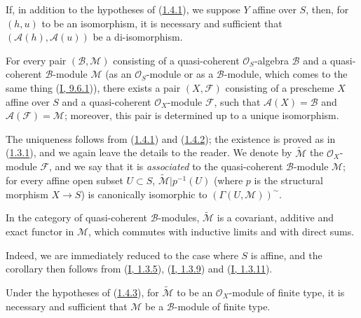 \begin{corollary}[1.4.2]
\label{II.1.4.2}
If, in addition to the hypotheses of (\hyperref[II.1.4.1]{1.4.1}), we
suppose $Y$ affine over $S$, then, for $(h,u)$ to be an isomorphism,
it is necessary and sufficient that $(\mathcal{A}(h),\mathcal{A}(u))$ be a
di-isomorphism.
\end{corollary}

\begin{proposition}[1.4.3]
\label{II.1.4.3}
For every pair $(\mathcal{B},\mathcal{M})$ consisting of a quasi-coherent
$\mathcal{O}_S$-algebra $\mathcal{B}$ and a quasi-coherent
$\mathcal{B}$-module $\mathcal{M}$ (as an
$\mathcal{O}_S$-module or as a $\mathcal{B}$-module, which comes to the
same thing (\hyperref[I.9.6.1]{I, 9.6.1})), there exists a pair
$(X,\mathcal{F})$ consisting of a prescheme $X$ affine over $S$ and a
quasi-coherent $\mathcal{O}_X$-module $\mathcal{F}$, such that
$\mathcal{A}(X)=\mathcal{B}$ and $\mathcal{A}(\mathcal{F})=\mathcal{M}$;
moreover, this pair is determined up to a unique isomorphism.
\end{proposition}

The uniqueness follows from (\hyperref[II.1.4.1]{1.4.1}) and
(\hyperref[II.1.4.2]{1.4.2}); the existence is proved as in
(\hyperref[II.1.3.1]{1.3.1}), and we again leave the details to the
reader. We denote by $\widetilde{\mathcal{M}}$ the $\mathcal{O}_X$-module
$\mathcal{F}$, and we say that it is \emph{associated} to the quasi-coherent
$\mathcal{B}$-module $\mathcal{M}$; for every affine open subset
$U\subset S$, $\widetilde{\mathcal{M}}|p^{-1}(U)$ (where $p$ is the
structural morphism $X\to S$) is canonically isomorphic to
$(\Gamma(U,\mathcal{M}))^{\sim}$.

\begin{corollary}[1.4.4]
\label{II.1.4.4}
In the category of quasi-coherent $\mathcal{B}$-modules,
$\widetilde{\mathcal{M}}$ is a covariant, additive and exact functor in
$\mathcal{M}$, which commutes with inductive limits and with direct sums.
\end{corollary}

Indeed, we are immediately reduced to the case where $S$ is affine, and the
corollary then follows from (\hyperref[I.1.3.5]{I, 1.3.5}),
(\hyperref[I.1.3.9]{I, 1.3.9}) and
(\hyperref[I.1.3.11]{I, 1.3.11}).

\begin{corollary}[1.4.5]
\label{II.1.4.5}
Under the hypotheses of (\hyperref[II.1.4.3]{1.4.3}), for
$\widetilde{\mathcal{M}}$ to be an $\mathcal{O}_X$-module of finite type, it
is necessary and sufficient that $\mathcal{M}$ be a $\mathcal{B}$-module of
finite type.
\end{corollary}

